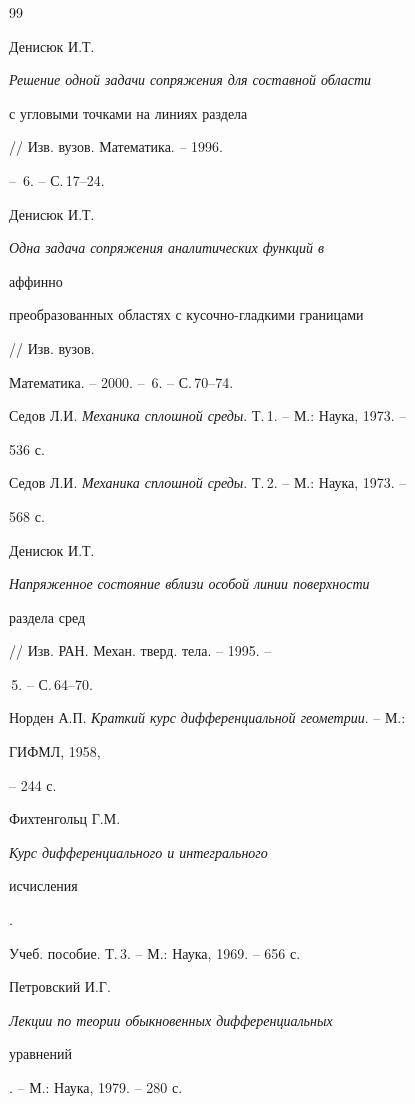 \begin{thebibliography}{99} 


 




Денисюк И.Т. {\em Решение одной задачи сопряжения для составной области 


с угловыми точками на линиях раздела} // Изв. вузов. Математика. -- 1996. 


-- \No\,6. -- С.\,17--24.  




Денисюк И.Т. {\em Одна задача сопряжения аналитических функций в 


аффинно 


преобразованных областях с кусочно-гладкими границами} // Изв. вузов. 


Математика. -- 2000. -- \No\,6. -- С.\,70--74. 




Седов Л.И. {\em Механика сплошной среды}. Т.\,1. -- М.: Наука, 1973. -- 


536  с. 




Седов Л.И. {\em Механика сплошной среды}. Т.\,2. -- М.: Наука, 1973. -- 


568  с.  




Денисюк И.Т. {\em Напряженное состояние вблизи особой линии поверхности 


раздела сред} // Изв. РАН. Механ. тверд. тела. -- 1995. -- 


\No\,5. -- С.\,64--70.  




Норден А.П. {\em Краткий курс дифференциальной геометрии}. -- М.: 


ГИФМЛ, 1958, 


-- 244 с. 




Фихтенгольц Г.М. {\em Курс дифференциального и интегрального 


исчисления}. 


Учеб. пособие. Т.\,3. -- М.: Наука, 1969. -- 656 с.  




Петровский И.Г. {\em Лекции по теории обыкновенных дифференциальных 


уравнений}. -- М.: Наука, 1979. -- 280 с.  





\end{thebibliography}
